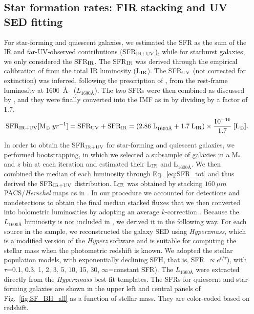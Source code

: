\subsection{Star formation rates: FIR stacking and UV SED fitting} \label{ssec:SFR}
 For star-forming and quiescent galaxies, we estimated the SFR as the sum of the IR and far-UV-observed contributions (SFR$_{\rm IR + UV}$), while for starburst galaxies, we only considered the SFR$_{\rm IR}$. The SFR$_{\rm IR}$ was derived through the empirical calibration of \citet[][Eq.~4]{1998ARA&A..36..189K} from the total IR luminosity (L$_{\rm IR}$). The SFR$_{\rm UV}$ (not corrected for extinction) was inferred, following the prescription of \citet[][Eq.1]{1998ARA&A..36..189K}, from the rest-frame luminosity at 1600~\AA~ ($L_{1600\text{\AA}}$). The two SFRs were then combined as discussed by \citet{2013ApJ...762..125N}, and they were finally converted into the \citet{2003PASP..115..763C} IMF as in \citet{2008A&A...482...21C} by dividing by a factor of 1.7,
\begin{multline}   \label{eq:SFR_tot}
\text{SFR}_{\rm IR + UV}[{\rm M}_\odot \; yr^{-1}]= \text{SFR}_{\rm UV} + \text{SFR}_{\rm IR} = (2.86  \;{\rm L}_{1600\text{\AA}}+1.7 \; {\rm L}_{\rm IR})\times \frac{10^{-10}}{1.7} \; [{\rm L}_\odot].
\end{multline}
 
 In order to obtain the SFR$_{\rm IR + UV}$ for star-forming and quiescent galaxies, we performed bootstrapping, in which we selected a subsample of galaxies in a M$_*$ and $z$ bin at each iteration and estimated their L$_{\rm IR}$ and L$_{1600\text{\AA}}$. We then combined the median of each luminosity through Eq.~\ref{eq:SFR_tot} and thus derived the SFR$_{\rm IR + UV}$ distribution.  L$_{\rm IR}$ was obtained by stacking $160~\mu m$ PACS/\textit{Herschel} maps as in \citet{2014MNRAS.443...19R}. In our procedure we accounted for detections and nondetections to obtain the final median stacked fluxes that we then converted into bolometric luminosities by adopting an average $k$-correction \citep{2001ApJ...556..562C}. Because the $L_{1600\text{\AA}}$ luminosity is not included in \citet{2016ApJS..224...24L}, we derived it in the following way. For each source in the sample, we reconstructed the galaxy SED using {\it Hyperzmass}, which is a modified version of the {\it Hyperz} software \citep{2000A&A...363..476B, 2010A&A...524A..76B} and is suitable for computing the stellar mass when the photometric redshift is known. We adopted the \citet{2003MNRAS.344.1000B} stellar population models, with exponentially declining SFH, that is, SFR~$\propto e^{t/\tau}$), with $\tau$=0.1, 0.3, 1, 2, 3, 5, 10, 15, 30,  $\infty$=constant SFR). The $L_{1600\text{\AA}}$ were extracted directly from the {\it Hyperzmass} best-fit templates. 
The SFRs for quiescent and star-forming galaxies are shown in the upper left and central panels of Fig.~\ref{fig:SF_BH_all} as a function of stellar mass. They are color-coded based on redshift.
 
